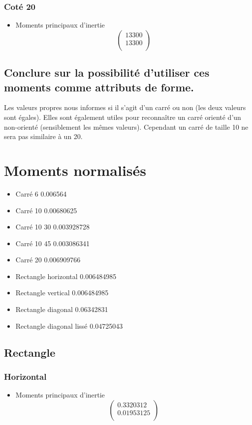 \documentclass[a4paper,12pt]{report}
\begin{document}
\subsubsection*{Coté 20}
\begin{itemize}
\item Moments principaux d'inertie
\[
   \left (
   \begin{array}{c}
      13300 \\
      13300 \\
   \end{array}
   \right )
\]
\end{itemize}

\subsection*{Conclure sur la possibilité d'utiliser ces moments comme attributs de forme.}

Les valeurs propres nous informes si il s'agit d'un carré ou non (les deux valeurs sont égales). Elles sont également utiles pour reconnaître un carré orienté d'un non-orienté (sensiblement les mêmes valeurs). Cependant un carré de taille 10 ne sera pas similaire à un 20.

\section*{Moments normalisés}

\begin{itemize}
\item Carré 6 0.006564
\item Carré 10 0.00680625
\item Carré 10 30  0.003928728
\item Carré 10 45 0.003086341
\item Carré 20 0.006909766
\item Rectangle horizontal 0.006484985
\item Rectangle vertical 0.006484985
\item Rectangle diagonal 0.06342831
\item Rectangle diagonal lissé 0.04725043
\end{itemize}



\subsection*{Rectangle}
\subsubsection*{Horizontal}
\begin{itemize}

\item Moments principaux d'inertie
\[
   \left (
   \begin{array}{c}
      0.3320312 \\
      0.01953125 \\
   \end{array}
   \right )
\]

\end{itemize}
\end{document}
